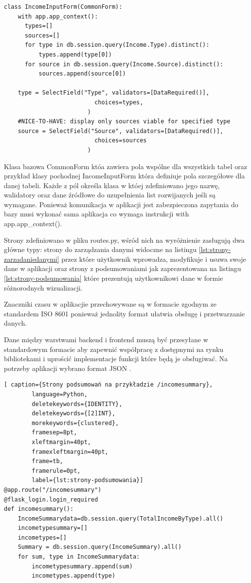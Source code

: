 \documentclass[a4paper,10pt, twoside]{report}
\begin{document}
\begin{large}
\begin{minipage}{\textwidth}
\begin{lstlisting}
class IncomeInputForm(CommonForm):
    with app.app_context():
      types=[]
      sources=[]
      for type in db.session.query(Income.Type).distinct():
          types.append(type[0])
      for source in db.session.query(Income.Source).distinct():
          sources.append(source[0])

    type = SelectField("Type", validators=[DataRequired()],
                          choices=types,
                        )
    #NICE-TO-HAVE: display only sources viable for specified type
    source = SelectField("Source", validators=[DataRequired()],
                          choices=sources
                        )\end{lstlisting}
{Klasa bazowa CommonForm któa zawiera pola wspólne dla wszystkich tabel oraz 
przykład klasy pochodnej IncomeInputForm która definiuje pola szczegółowe dla 
danej tabeli. Każde z pól określa klasa w któej zdefiniowano jego nazwę, 
walidatory oraz dane źródłowe do uzupełnienia list rozwijanych jeśli są 
wymagane. Ponieważ komunikacja w aplikacji jest zabezpieczona zapytania do bazy 
musi wykonać sama aplikacja co wymaga instrukcji with app.app\_context().}
\end{minipage}

{Strony zdefiniowano w pliku routes.py, wśród nich na wyróżnienie zasługują dwa 
główne typy: strony do zarządzania danymi widoczne na listingu 
\ref*{lst:strony-zarzadaniedanymi} przez które użytkownik wprowadza, modyfikuje 
i usuwa swoje dane w aplikacji oraz strony z podsumowaniami jak zaprezentowana 
na listingu \ref*{lst:strony-podsumowania} które prezentują użytkownikowi dane w
 formie różnorodnych wizualizacji.}

{Znaczniki czasu w aplikacjie przechowywane są w formacie zgodnym ze standardem 
ISO 8601 \cite{ISO 8601} ponieważ jednolity format ułatwia obsługę i 
przetwarzanie danych.}

{Dane między warstwami backend i frontend muszą być przesyłane w standardowym 
formacie aby zapewnić współpracę z dostępnymi na rynku bibliotekami i uprościć 
implementacje funkcji które będą je obsługiwać. Na potrzeby aplikacji wybrano 
format JSON \cite{JSON}.}

\begin{minipage}{\textwidth}
    \begin{lstlisting}[ caption={Strony podsumowań na przykładzie /incomesummary},
        language=Python,
        deletekeywords={IDENTITY},
        deletekeywords={[2]INT},
        morekeywords={clustered},
        framesep=8pt,
        xleftmargin=40pt,
        framexleftmargin=40pt,
        frame=tb,
        framerule=0pt,
        label={lst:strony-podsumowania}]
@app.route("/incomesummary")
@flask_login.login_required
def incomesummary():
    IncomeSummarydata=db.session.query(TotalIncomeByType).all()
    incometypesummary=[]
    incometypes=[]
    Summary = db.session.query(IncomeSummary).all()
    for sum, type in IncomeSummarydata:
        incometypesummary.append(sum)
        incometypes.append(type)


\end{lstlisting}
\end{minipage}
\end{large}
\end{document}
